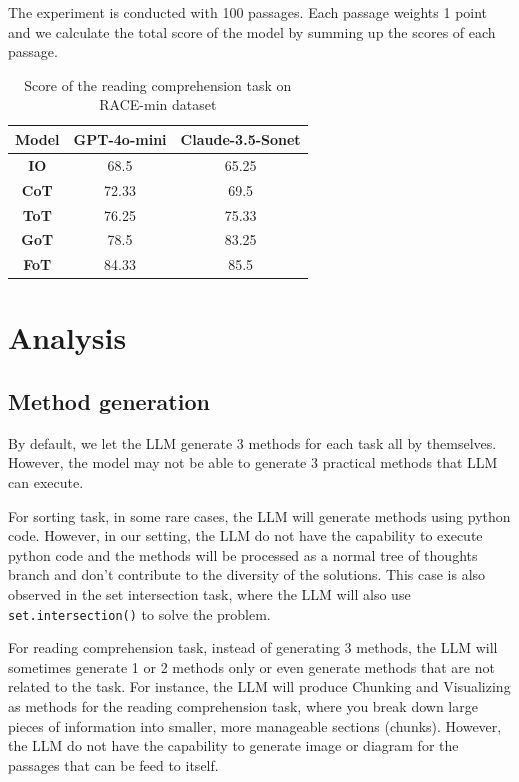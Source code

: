 \documentclass{article}
\begin{document}
The experiment is conducted with 100 passages. Each passage weights 1 point and we calculate the total score of the model by summing up the scores of each passage. 

\begin{table}[h]
    \centering
    \begin{tabular}{|c|c|c|}
        \hline
        \textbf{Model} & \textbf{GPT-4o-mini} & \textbf{Claude-3.5-Sonet} \\
        \hline \hline
        \textbf{IO}    & 68.5                 & 65.25                    \\
        \textbf{CoT}   & 72.33                & 69.5                     \\
        \textbf{ToT}   & 76.25                & 75.33                    \\
        \textbf{GoT}   & 78.5                 & 83.25                    \\
        \textbf{FoT}   & 84.33                & 85.5                     \\
        \hline
    \end{tabular}
    \vspace{1em}
    \caption{Score of the reading comprehension task on RACE-min dataset}
    \label{tab:reading_comprehension_results}
\end{table}

\section{Analysis}

\subsection{Method generation}

By default, we let the LLM generate 3 methods for each task all by themselves. However, the model may not be able to generate 3 practical methods that LLM can execute. 

For sorting task, in some rare cases, the LLM will generate methods using python code. However, in our setting, the LLM do not have the capability to execute python code and the methods will be processed as a normal tree of thoughts branch and don't contribute to the diversity of the solutions. This case is also observed in the set intersection task, where the LLM will also use \texttt{set.intersection()} to solve the problem.

For reading comprehension task, instead of generating 3 methods, the LLM will sometimes generate 1 or 2 methods only or even generate methods that are not related to the task. For instance, the LLM will produce Chunking and Visualizing as methods for the reading comprehension task, where you break down large pieces of information into smaller, more manageable sections (chunks). However, the LLM do not have the capability to generate image or diagram for the passages that can be feed to itself.
\end{document}
